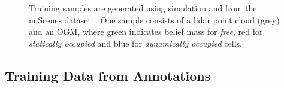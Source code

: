\documentclass[conference]{IEEEtran}
\begin{document}
\begin{figure}
\centering
{}
\caption{Training samples are generated using simulation and from the nuScenes dataset~\cite{Caesar.2020}. One sample consists of a lidar point cloud (grey) and an OGM, where green indicates belief mass for \textit{free}, red for \textit{statically occupied} and blue for \textit{dynamically occupied} cells.}
\label{fig:training-samples}
\end{figure}


\subsection{Training Data from Annotations}\label{sec:training-nuscenes}
\end{document}
